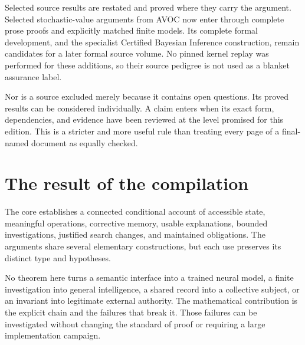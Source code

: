 Selected source results are restated and proved where they carry the argument. Selected stochastic-value arguments from AVOC now enter through complete prose proofs and explicitly matched finite models. Its complete formal development, and the specialist Certified Bayesian Inference construction, remain candidates for a later formal source volume. No pinned kernel replay was performed for these additions, so their source pedigree is not used as a blanket assurance label.

Nor is a source excluded merely because it contains open questions. Its proved results can be considered individually. A claim enters when its exact form, dependencies, and evidence have been reviewed at the level promised for this edition. This is a stricter and more useful rule than treating every page of a final-named document as equally checked.

\section{The result of the compilation}
The core establishes a connected conditional account of accessible state, meaningful operations, corrective memory, usable explanations, bounded investigations, justified search changes, and maintained obligations. The arguments share several elementary constructions, but each use preserves its distinct type and hypotheses.

No theorem here turns a semantic interface into a trained neural model, a finite investigation into general intelligence, a shared record into a collective subject, or an invariant into legitimate external authority. The mathematical contribution is the explicit chain and the failures that break it. Those failures can be investigated without changing the standard of proof or requiring a large implementation campaign.

